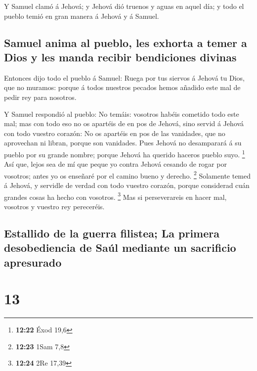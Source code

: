  Y Samuel clamó á Jehová; y Jehová dió truenos y aguas en
aquel día; y todo el pueblo temió en gran manera á Jehová y á Samuel.

\hypertarget{samuel-anima-al-pueblo-les-exhorta-a-temer-a-dios-y-les-manda-recibir-bendiciones-divinas}{%
\subsection{Samuel anima al pueblo, les exhorta a temer a Dios y les
manda recibir bendiciones
divinas}\label{samuel-anima-al-pueblo-les-exhorta-a-temer-a-dios-y-les-manda-recibir-bendiciones-divinas}}

 Entonces dijo todo el pueblo á Samuel: Ruega por tus
siervos á Jehová tu Dios, que no muramos: porque á todos nuestros
pecados hemos añadido este mal de pedir rey para nosotros.

 Y Samuel respondió al pueblo: No temáis: vosotros habéis
cometido todo este mal; mas con todo eso no os apartéis de en pos de
Jehová, sino servid á Jehová con todo vuestro corazón: 
No os apartéis en pos de las vanidades, que no aprovechan ni libran,
porque son vanidades.  Pues Jehová no desamparará á su
pueblo por su grande nombre; porque Jehová ha querido haceros pueblo
suyo. \footnote{\textbf{12:22} Éxod 19,6}  Así que, lejos
sea de mí que peque yo contra Jehová cesando de rogar por vosotros;
antes yo os enseñaré por el camino bueno y derecho. \footnote{\textbf{12:23}
  1Sam 7,8}  Solamente temed á Jehová, y servidle de
verdad con todo vuestro corazón, porque considerad cuán grandes cosas ha
hecho con vosotros. \footnote{\textbf{12:24} 2Re 17,39} 
Mas si perseverareis en hacer mal, vosotros y vuestro rey pereceréis.

\hypertarget{estallido-de-la-guerra-filistea-la-primera-desobediencia-de-sauxfal-mediante-un-sacrificio-apresurado}{%
\subsection{Estallido de la guerra filistea; La primera desobediencia de
Saúl mediante un sacrificio
apresurado}\label{estallido-de-la-guerra-filistea-la-primera-desobediencia-de-sauxfal-mediante-un-sacrificio-apresurado}}

\hypertarget{section-12}{%
\section{13}\label{section-12}}

